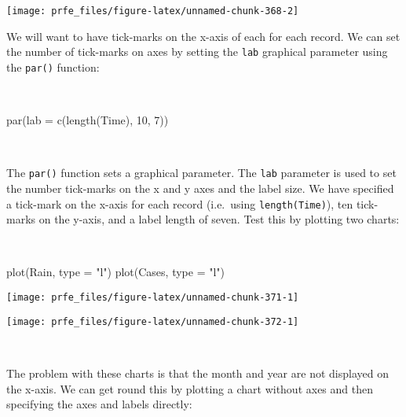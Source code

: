 \documentclass[
  12pt,
  a4paper]{book}
\newenvironment{Shaded}{\begin{snugshade}}{\end{snugshade}}
\newcommand{\AttributeTok}[1]{\textcolor[rgb]{0.77,0.63,0.00}{#1}}
\newcommand{\DecValTok}[1]{\textcolor[rgb]{0.00,0.00,0.81}{#1}}
\newcommand{\FunctionTok}[1]{\textcolor[rgb]{0.00,0.00,0.00}{#1}}
\newcommand{\NormalTok}[1]{#1}
\newcommand{\StringTok}[1]{\textcolor[rgb]{0.31,0.60,0.02}{#1}}
\begin{document}
\begin{center}\texttt{[image: prfe\_files/figure-latex/unnamed-chunk-368-2]} \end{center}

\newpage

We will want to have tick-marks on the x-axis of each for each record. We can set the number of tick-marks on axes by setting the \texttt{lab} graphical parameter using the \texttt{par()} function:

~

\begin{Shaded}
\begin{Highlighting}[]
\FunctionTok{par}\NormalTok{(}\AttributeTok{lab =} \FunctionTok{c}\NormalTok{(}\FunctionTok{length}\NormalTok{(Time), }\DecValTok{10}\NormalTok{, }\DecValTok{7}\NormalTok{))}
\end{Highlighting}
\end{Shaded}

~

The \texttt{par()} function sets a graphical parameter. The \texttt{lab} parameter is used to set the number tick-marks on the x and y axes and the label size. We have specified a tick-mark on the x-axis for each record (i.e.~using \texttt{length(Time)}), ten tick-marks on the y-axis, and a label length of seven. Test this by plotting two charts:

~

\begin{Shaded}
\begin{Highlighting}[]
\FunctionTok{plot}\NormalTok{(Rain, }\AttributeTok{type =} \StringTok{"l"}\NormalTok{)}
\FunctionTok{plot}\NormalTok{(Cases, }\AttributeTok{type =} \StringTok{"l"}\NormalTok{)}
\end{Highlighting}
\end{Shaded}

\begin{center}\texttt{[image: prfe\_files/figure-latex/unnamed-chunk-371-1]} \end{center}

\newpage

\begin{center}\texttt{[image: prfe\_files/figure-latex/unnamed-chunk-372-1]} \end{center}

~

The problem with these charts is that the month and year are not displayed on the x-axis. We can get round this by plotting a chart without axes and then specifying the axes and labels directly:
\end{document}
